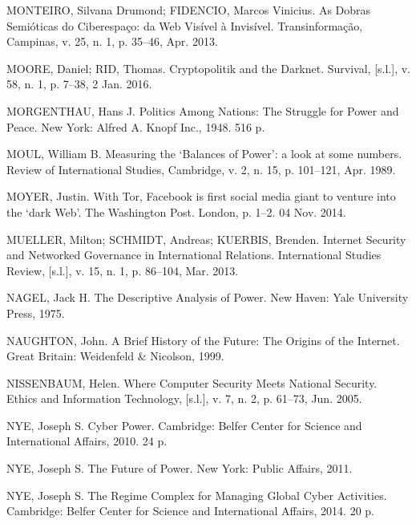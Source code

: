 \begin{list}{}{\setlength{\leftmargin}{0pt}\setlength{\itemsep}{6pt}\setlength{\parsep}{0pt}}
\item MONTEIRO, Silvana Drumond; FIDENCIO, Marcos Vinicius. As Dobras Semi\'oticas do Ciberespa\c{c}o: da Web Vis\'ivel \`a Invis\'ivel. Transinforma\c{c}\~ao, Campinas, v. 25, n. 1, p. 35--46, Apr. 2013.

\item MOORE, Daniel; RID, Thomas. Cryptopolitik and the Darknet. Survival, [s.l.], v. 58, n. 1, p. 7--38, 2 Jan. 2016.

\item MORGENTHAU, Hans J. Politics Among Nations: The Struggle for Power and Peace. New York: Alfred A. Knopf Inc., 1948. 516 p.

\item MOUL, William B. Measuring the `Balances of Power': a look at some numbers. Review of International Studies, Cambridge, v. 2, n. 15, p. 101--121, Apr. 1989.

\item MOYER, Justin. With Tor, Facebook is first social media giant to venture into the `dark Web'. The Washington Post. London, p. 1--2. 04 Nov. 2014.

\item MUELLER, Milton; SCHMIDT, Andreas; KUERBIS, Brenden. Internet Security and Networked Governance in International Relations. International Studies Review, [s.l.], v. 15, n. 1, p. 86--104, Mar. 2013.

\item NAGEL, Jack H. The Descriptive Analysis of Power. New Haven: Yale University Press, 1975.

\item NAUGHTON, John. A Brief History of the Future: The Origins of the Internet. Great Britain: Weidenfeld \& Nicolson, 1999.

\item NISSENBAUM, Helen. Where Computer Security Meets National Security. Ethics and Information Technology, [s.l.], v. 7, n. 2, p. 61--73, Jun. 2005.

\item NYE, Joseph S. Cyber Power. Cambridge: Belfer Center for Science and International Affairs, 2010. 24 p.

\item NYE, Joseph S. The Future of Power. New York: Public Affairs, 2011.

\item NYE, Joseph S. The Regime Complex for Managing Global Cyber Activities. Cambridge: Belfer Center for Science and International Affairs, 2014. 20 p.


\end{list}

